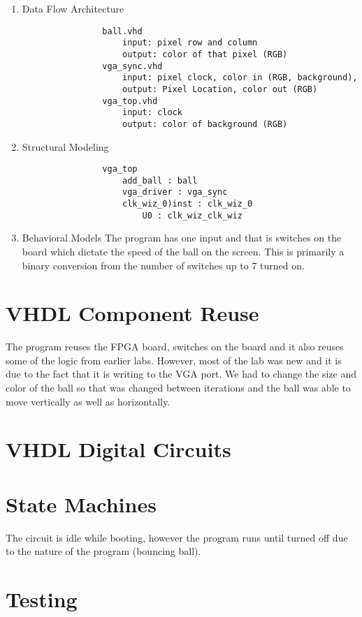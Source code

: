     \begin{enumerate}
        \item Data Flow Architecture
            \begin{verbatim}
                ball.vhd
                    input: pixel row and column
                    output: color of that pixel (RGB)
                vga_sync.vhd
                    input: pixel clock, color in (RGB, background),
                    output: Pixel Location, color out (RGB)
                vga_top.vhd
                    input: clock
                    output: color of background (RGB)
            \end{verbatim}
        \item Structural Modeling
            \begin{verbatim}
                vga_top 
                    add_ball : ball
                    vga_driver : vga_sync
                    clk_wiz_0)inst : clk_wiz_0
                        U0 : clk_wiz_clk_wiz
            \end{verbatim}
        \item Behavioral Models
            The program has one input and that is switches on the board which dictate the speed of the ball on the screen. This is primarily a binary conversion from the number of switches up to 7 turned on. 
     \end{enumerate}

 \section{VHDL Component Reuse}
    The program reuses the FPGA board, switches on the board and it also reuses some of the logic from earlier labs. However, most of the lab was new and it is due to the fact that it is writing to the VGA port. We had to change the size and color of the ball so that was changed between iterations and the ball was able to move vertically as well as horizontally. 
 \section{VHDL Digital Circuits}
    
 \section{State Machines}
    The circuit is idle while booting, however the program runs until turned off due to the nature of the program (bouncing ball). 
 \section{Testing}
